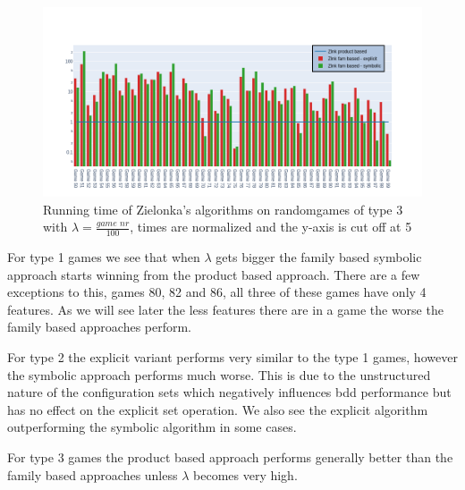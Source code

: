 \begin{figure}[H]
\includegraphics[width=1\linewidth]{"results/BC_randomgames/Zlnk product based_Zlnk fam based - explicit_Zlnk fam based - symbolic_"}
\caption{Running time of Zielonka's algorithms on randomgames of type 3 with $\lambda = \frac{\textit{game nr}}{100}$, times are normalized and the y-axis is cut off at 5}
\label{fig:elevatorzlnks}
\end{figure}%
For type 1 games we see that when $\lambda$ gets bigger the family based symbolic approach starts winning from the product based approach. There are a few exceptions to this, games 80, 82 and 86, all three of these games have only 4 features. As we will see later the less features there are in a game the worse the family based approaches perform.

For type 2 the explicit variant performs very similar to the type 1 games, however the symbolic approach performs much worse. This is due to the unstructured nature of the configuration sets which negatively influences bdd performance but has no effect on the explicit set operation. We also see the explicit algorithm outperforming the symbolic algorithm in some cases.

For type 3 games the product based approach performs generally better than the family based approaches unless $\lambda$ becomes very high.

